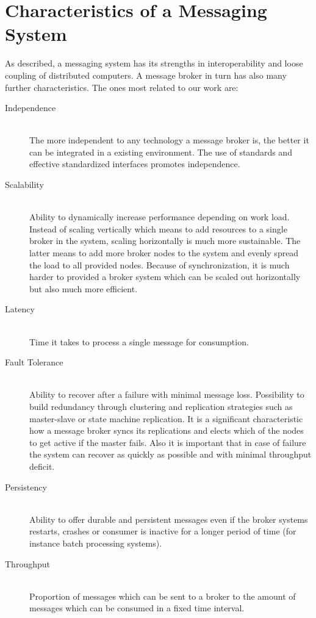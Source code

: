 \section{Characteristics of a Messaging System}
\label{intro-messaging-characteristics}

As described, a messaging system has its strengths in interoperability and loose
coupling of distributed computers. 
A message broker in turn has also many further
characteristics. The ones most related to our work are:

\begin{description}
    \item [Independence] \hfill \\
    {   The more independent to any technology a message broker is, the better
        it can be integrated in a existing environment. The use of standards and
        effective standardized interfaces promotes independence.}
    \item [Scalability] \hfill \\
    {   Ability to dynamically increase performance depending on work load.
        Instead of scaling vertically which means to add resources to a single
        broker in the system, scaling horizontally is much more sustainable. The
        latter means to add more broker nodes to the system and evenly spread the
        load to all provided nodes. Because of synchronization, it is much
        harder to provided a broker system which can be scaled out horizontally
        but also much more efficient. }
    \item [Latency]\hfill \\
    {    Time it takes to process a single message for consumption.  }
    \item [Fault Tolerance] \hfill \\
    {    Ability to recover after a failure with minimal message loss.
            Possibility to build redundancy through clustering and
            replication strategies such as master-slave or state machine
            replication. It is a significant characteristic how a
            message broker syncs its replications and elects which of the nodes
            to get active if the master fails. Also it is important that in case
            of failure the system can recover as quickly as possible and with
            minimal throughput deficit.   }
    \item [Persistency] \hfill \\ 
        {Ability to offer durable and persistent messages even if the broker
            systems restarts, crashes or consumer is inactive for a longer period of time
            (for instance batch processing systems). }
    \item [Throughput] \hfill \\
        {Proportion of messages which can be sent to a broker to the amount of
        messages which can be consumed in a fixed time interval.}
\end{description}


